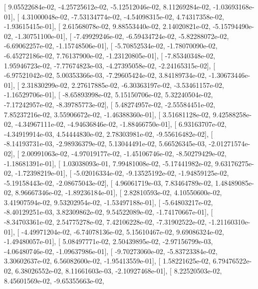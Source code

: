 \documentclass{article}
\begin{document}
       [  9.05522684e-02,  -4.25725612e-02,  -5.12512046e-02,
          8.11269284e-02,  -1.03693168e-01],
       [  4.31000048e-02,  -7.53134774e-02,  -4.54098315e-02,
          4.74317358e-02,  -1.93615415e-01],
       [  2.61568078e-02,   9.88553440e-02,   2.14020821e-02,
         -5.15794490e-02,  -1.30751100e-01],
       [ -7.49929246e-02,  -6.59434724e-02,  -5.82288072e-02,
         -6.69062257e-02,  -1.15748506e-01],
       [ -5.70852534e-02,  -1.78070090e-02,  -6.45272186e-02,
          7.76137900e-02,  -1.23120805e-01],
       [ -7.85340348e-02,   1.95946723e-02,  -7.77674823e-03,
         -4.27395058e-02,  -2.24165315e-02],
       [ -6.97521042e-02,   5.00353366e-03,  -7.29605424e-02,
          3.84189734e-02,  -1.30673446e-01],
       [  2.31830299e-02,   2.27617885e-02,  -6.30363197e-02,
         -3.53461157e-02,  -1.16529706e-01],
       [ -8.65893998e-02,   5.15150706e-02,   5.32240504e-02,
         -7.17242957e-02,  -8.39785773e-02],
       [  5.48274957e-02,  -2.55584451e-02,   7.85237216e-02,
          3.55906672e-02,  -1.46388360e-01],
       [  3.51681128e-02,   9.42588258e-02,  -4.34967111e-02,
         -4.94636846e-02,  -1.88466750e-01],
       [  6.93163707e-02,  -4.34919914e-03,   4.54444830e-02,
          2.78303981e-02,  -9.55616482e-02],
       [ -8.14193731e-03,  -2.98936379e-02,   5.13044491e-02,
          5.66526345e-03,  -2.01271574e-02],
       [  2.00991063e-02,  -4.97019177e-02,  -1.45106746e-02,
         -8.50279429e-02,  -1.18681391e-01],
       [  1.03038093e-01,   7.99481008e-02,  -5.17441982e-02,
          9.63176275e-02,  -1.72398219e-01],
       [ -5.02016334e-02,  -9.13525192e-02,  -1.94859125e-02,
         -5.19158443e-02,  -2.08675043e-02],
       [  4.96061719e-03,   7.83464789e-02,   1.48489085e-02,
          8.96667346e-02,  -1.89236184e-01],
       [  2.82810593e-02,   4.10550600e-02,   3.41907594e-02,
          9.53202954e-02,  -1.53497188e-01],
       [ -5.64803217e-02,  -8.40129251e-03,   3.82309862e-02,
          9.54522089e-02,  -1.74170667e-01],
       [ -8.34703361e-02,   2.54775278e-02,   7.42106228e-02,
         -7.31902522e-02,  -1.21160310e-01],
       [ -4.49971204e-02,  -6.74078136e-02,   5.15610467e-02,
          9.69086324e-02,  -1.49480057e-01],
       [  5.08497771e-02,   2.50439895e-02,  -2.97156799e-03,
         -4.06480746e-02,  -1.09637986e-01],
       [ -9.70273060e-02,  -5.83723384e-02,   3.30602637e-02,
          6.56082600e-02,  -1.95413559e-01],
       [  1.58221625e-02,   6.79476522e-02,   6.38026552e-02,
          8.11661603e-03,  -2.10927468e-01],
       [  8.22520503e-02,   8.45601569e-02,  -9.65355663e-02,
\end{document}
